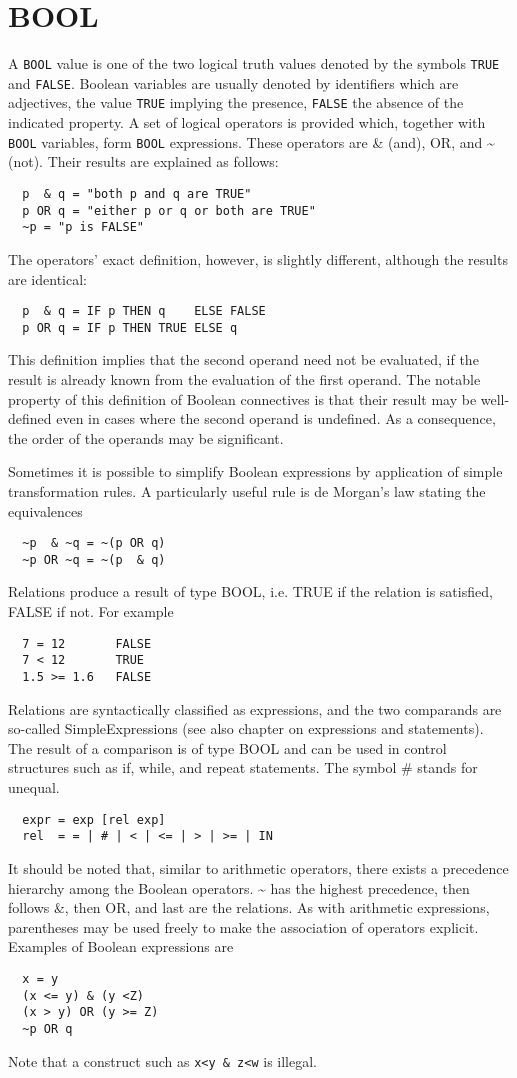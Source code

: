\section{BOOL}
A \verb|BOOL| value is one of the two logical truth values denoted by the symbols \verb|TRUE| and
\verb|FALSE|. Boolean variables are usually denoted by identifiers which are adjectives, the value
\verb|TRUE| implying the presence, \verb|FALSE| the absence of the indicated property. A set of logical
operators is provided which, together with \verb|BOOL| variables, form \verb|BOOL| expressions. These
operators are \& (and), OR, and \~{} (not). Their results are explained as follows:
\begin{verbatim}
  p  & q = "both p and q are TRUE"
  p OR q = "either p or q or both are TRUE"
  ~p = "p is FALSE"
\end{verbatim}
The operators’ exact definition, however, is slightly different, although the results are identical:
\begin{verbatim}
  p  & q = IF p THEN q    ELSE FALSE
  p OR q = IF p THEN TRUE ELSE q
\end{verbatim}
This definition implies that the second operand need not be evaluated, if the result is already known
from the evaluation of the first operand. The notable property of this definition of Boolean
connectives is that their result may be well-defined even in cases where the second operand is
undefined. As a consequence, the order of the operands may be significant.

Sometimes it is possible to simplify Boolean expressions by application of simple transformation
rules. A particularly useful rule is de Morgan's law stating the equivalences
\begin{verbatim}
  ~p  & ~q = ~(p OR q)
  ~p OR ~q = ~(p  & q)
\end{verbatim}
Relations produce a result of type BOOL, i.e. TRUE if the relation is satisfied, FALSE if not.
For example
\begin{verbatim}
  7 = 12       FALSE
  7 < 12       TRUE
  1.5 >= 1.6   FALSE
\end{verbatim}
Relations are syntactically classified as expressions, and the two comparands are so-called
SimpleExpressions (see also chapter on expressions and statements). The result of a comparison
is of type BOOL and can be used in control structures such as if, while, and repeat statements.
The symbol \# stands for unequal.
\begin{verbatim}
  expr = exp [rel exp]
  rel  = = | # | < | <= | > | >= | IN
\end{verbatim}
It should be noted that, similar to arithmetic operators, there exists a precedence hierarchy among
the Boolean operators. \~{} has the highest precedence, then follows \&, then OR, and last are the
relations. As with arithmetic expressions, parentheses may be used freely to make the association
of operators explicit. Examples of Boolean expressions are
\begin{verbatim}
  x = y
  (x <= y) & (y <Z)
  (x > y) OR (y >= Z)
  ~p OR q
\end{verbatim}
Note that a construct such as \verb|x<y & z<w| is illegal.

